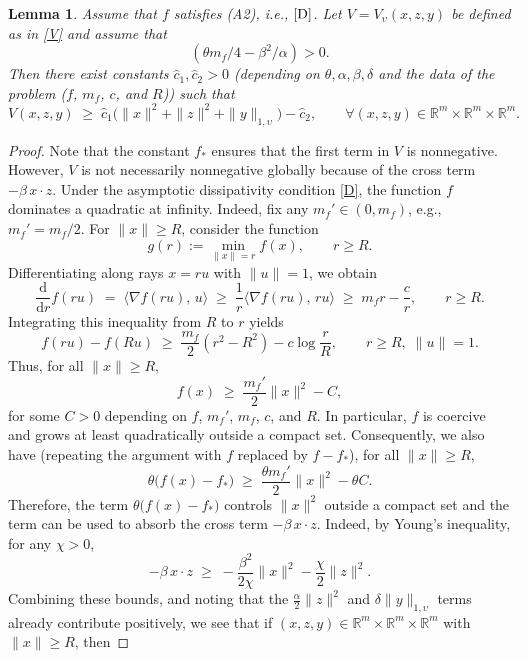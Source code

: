 \documentclass[11pt, a4paper,leqno]{amsart}
\newtheorem{lemma}{Lemma}[section]
\theoremstyle{definition}
\numberwithin{equation}{section}
\newcommand{\R}{\mathbb R}
\begin{document}
\begin{lemma}\label{lowb}  Assume that $f$ satisfies \textnormal{(A2)}, i.e., $\eqref{D}$. Let $V=V_\upsilon(x,z,y)$ be defined as in \eqref{V} and assume that
\begin{equation}\label{Vcond}({\theta m_f}/{4}-{\beta^2}/{\alpha})>0.
\end{equation} Then  there exist constants $\hat c_1,\hat c_2>0$ (depending on $\theta,\alpha,\beta,\delta$ and the data of the problem ($f$,  $m_f$, $c$, and $R$)) such that
\begin{equation}\label{eq:drift-ineql}
V(x,z,y)\;\ge\; \hat c_1\bigl(\|x\|^2+\|z\|^2+\|y\|_{1,\upsilon}\bigr) - \hat c_2,
\qquad \forall (x,z,y)\in\R^{m}\times \R^m\times\R^m.
\end{equation}
\end{lemma}
\begin{proof}  Note that the constant $f_\ast$ ensures that the first term in $V$ is nonnegative. However, $V$ is not
necessarily nonnegative globally because of the cross term $-\beta\,x\cdot z$. Under the asymptotic dissipativity condition \eqref{D},  the function $f$ dominates a quadratic at infinity. Indeed, fix any $m_f'\in(0,m_f)$, e.g., $m_f'=m_f/2$. For $\|x\|\ge R$, consider the function
\[
g(r) := \min_{\|x\|=r} f(x), \qquad r\ge R.
\]
Differentiating along rays $x=ru$ with $\|u\|=1$, we obtain
\[
\frac{\mathrm{d}}{\mathrm{d}r} f(ru) \;=\; \langle \nabla f(ru),\,u\rangle
\;\ge\; \frac{1}{r}\langle \nabla f(ru),\,ru\rangle
\;\ge\; m_f r - \frac{c}{r}, \qquad r\ge R.
\]
Integrating this inequality from $R$ to $r$ yields
\[
f(ru) - f(Ru) \;\ge\; \frac{m_f}{2}(r^2-R^2) - c\log\frac{r}{R},
\qquad r\ge R, \;\|u\|=1.
\]
Thus, for all $\|x\|\ge R$,
\[
f(x) \;\ge\; \frac{m_f'}{2}\|x\|^2 - C,
\]
for some $C>0$ depending on $f$, $m_f'$, $m_f$, $c$, and $R$.
In particular, $f$ is coercive and grows at least quadratically outside a compact set. Consequently,  we also have (repeating the argument with $f$ replaced by $f-f_\ast$), for all $\|x\|\ge R$,
\[
\theta\bigl(f(x)-f_\ast\bigr) \;\ge\; \frac{\theta m_f'}{2}\|x\|^2 - \theta C.
\]
Therefore, the term $\theta\bigl(f(x)-f_\ast\bigr)$ controls $\|x\|^2$ outside a compact set and the term can be used to absorb the cross term $-\beta\,x\cdot z$. Indeed, by Young's inequality, for any $\chi>0$,
\[
-\beta\,x\cdot z \;\ge\; -\frac{\beta^2}{2\chi}\|x\|^2 - \frac{\chi}{2}\|z\|^2.
\]
Combining these bounds, and noting that the $\frac\alpha 2\|z\|^2$ and $\delta\|y\|_{1,\upsilon}$ terms already contribute positively, we see that  if  $(x,z,y)\in \R^{m}\times \R^m\times \R^m$ with $\|x\|\ge R$, then

\end{proof}
\end{document}
